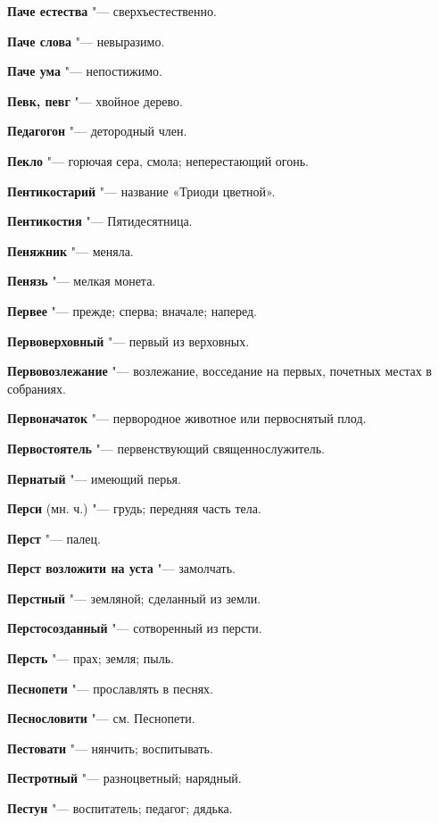 \begin{mymulticols}
\noindent\textbf{Паче естества} "--- сверхъестественно. 

\noindent\textbf{Паче слова} "--- невыразимо. 

\noindent\textbf{Паче ума} "--- непостижимо. 

\noindent\textbf{Певк, певг} "--- хвойное дерево. 

\noindent\textbf{Педагогон} "--- детородный член. 

\noindent\textbf{Пекло} "--- горючая сера, смола; неперестающий огонь. 

\noindent\textbf{Пентикостарий} "--- название «Триоди цветной». 

\noindent\textbf{Пентикостия} "--- Пятидесятница. 

\noindent\textbf{Пеняжник} "--- меняла. 

\noindent\textbf{Пенязь} "--- мелкая монета. 

\noindent\textbf{Первее} "--- прежде; сперва; вначале; наперед. 

\noindent\textbf{Первоверховный} "--- первый из верховных. 

\noindent\textbf{Первовозлежание} "--- возлежание, восседание на первых, почетных местах в собраниях. 

\noindent\textbf{Первоначаток} "--- первородное животное или первоснятый плод. 

\noindent\textbf{Первостоятель} "--- первенствующий священнослужитель. 

\noindent\textbf{Пернатый} "--- имеющий перья. 

\noindent\textbf{Перси} (мн. ч.) "--- грудь; передняя часть тела. 

\noindent\textbf{Перст} "--- палец. 

\noindent\textbf{Перст возложити на уста} "--- замолчать. 

\noindent\textbf{Перстный} "--- земляной; сделанный из земли. 

\noindent\textbf{Перстосозданный} "--- сотворенный из персти. 

\noindent\textbf{Персть} "--- прах; земля; пыль. 

\noindent\textbf{Песнопети} "--- прославлять в песнях. 

\noindent\textbf{Песнословити} "--- см. Песнопети. 

\noindent\textbf{Пестовати} "--- нянчить; воспитывать. 

\noindent\textbf{Пестротный} "--- разноцветный; нарядный. 

\noindent\textbf{Пестун} "--- воспитатель; педагог; дядька. 


\end{mymulticols}
